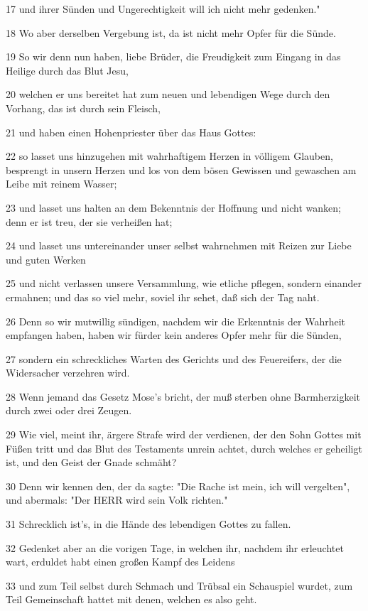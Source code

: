 \par 17 und ihrer Sünden und Ungerechtigkeit will ich nicht mehr gedenken."
\par 18 Wo aber derselben Vergebung ist, da ist nicht mehr Opfer für die Sünde.
\par 19 So wir denn nun haben, liebe Brüder, die Freudigkeit zum Eingang in das Heilige durch das Blut Jesu,
\par 20 welchen er uns bereitet hat zum neuen und lebendigen Wege durch den Vorhang, das ist durch sein Fleisch,
\par 21 und haben einen Hohenpriester über das Haus Gottes:
\par 22 so lasset uns hinzugehen mit wahrhaftigem Herzen in völligem Glauben, besprengt in unsern Herzen und los von dem bösen Gewissen und gewaschen am Leibe mit reinem Wasser;
\par 23 und lasset uns halten an dem Bekenntnis der Hoffnung und nicht wanken; denn er ist treu, der sie verheißen hat;
\par 24 und lasset uns untereinander unser selbst wahrnehmen mit Reizen zur Liebe und guten Werken
\par 25 und nicht verlassen unsere Versammlung, wie etliche pflegen, sondern einander ermahnen; und das so viel mehr, soviel ihr sehet, daß sich der Tag naht.
\par 26 Denn so wir mutwillig sündigen, nachdem wir die Erkenntnis der Wahrheit empfangen haben, haben wir fürder kein anderes Opfer mehr für die Sünden,
\par 27 sondern ein schreckliches Warten des Gerichts und des Feuereifers, der die Widersacher verzehren wird.
\par 28 Wenn jemand das Gesetz Mose's bricht, der muß sterben ohne Barmherzigkeit durch zwei oder drei Zeugen.
\par 29 Wie viel, meint ihr, ärgere Strafe wird der verdienen, der den Sohn Gottes mit Füßen tritt und das Blut des Testaments unrein achtet, durch welches er geheiligt ist, und den Geist der Gnade schmäht?
\par 30 Denn wir kennen den, der da sagte: "Die Rache ist mein, ich will vergelten", und abermals: "Der HERR wird sein Volk richten."
\par 31 Schrecklich ist's, in die Hände des lebendigen Gottes zu fallen.
\par 32 Gedenket aber an die vorigen Tage, in welchen ihr, nachdem ihr erleuchtet wart, erduldet habt einen großen Kampf des Leidens
\par 33 und zum Teil selbst durch Schmach und Trübsal ein Schauspiel wurdet, zum Teil Gemeinschaft hattet mit denen, welchen es also geht.
